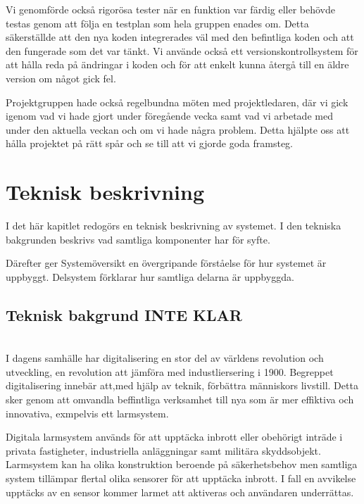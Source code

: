 \documentclass{article}
\begin{document}
Vi genomförde också rigorösa tester när en funktion var färdig eller behövde testas genom att följa en testplan som hela gruppen enades om. 
Detta säkerställde att den nya koden integrerades väl med den befintliga koden och att den fungerade som det var tänkt.
Vi använde också ett versionskontrollsystem för att hålla reda på ändringar i koden och för att enkelt kunna återgå till en äldre version om något gick fel.

Projektgruppen hade också regelbundna möten med projektledaren,
där vi gick igenom vad vi hade gjort under föregående vecka samt vad vi arbetade med under den aktuella veckan och om vi hade några problem.
Detta hjälpte oss att hålla projektet på rätt spår och se till att vi gjorde goda framsteg.


\newpage
\section{Teknisk beskrivning}
I det här kapitlet redogörs en teknisk beskrivning av systemet. 
I den tekniska bakgrunden beskrivs vad samtliga komponenter har för syfte.

Därefter ger Systemöversikt en övergripande förståelse för hur systemet är uppbyggt. Delsystem förklarar hur samtliga delarna är uppbyggda.

\subsection{Teknisk bakgrund INTE KLAR }\\
I dagens samhälle har digitalisering en stor del av världens revolution och utveckling, en revolution att jämföra med industliersering i 1900. Begreppet digitalisering innebär att,med hjälp av teknik, förbättra människors livstill. Detta sker genom att omvandla beffintliga verksamhet till nya som är mer effiktiva och innovativa, exmpelvis ett larmsystem. 

Digitala larmsystem används för att upptäcka inbrott eller obehörigt inträde i privata fastigheter, industriella anläggningar samt militära skyddsobjekt. Larmsystem kan ha olika konstruktion beroende på säkerhetsbehov men samtliga system tillämpar flertal olika sensorer för att upptäcka inbrott. I fall en avvikelse upptäcks av en sensor kommer larmet att aktiveras och användaren underrättas.
\end{document}
